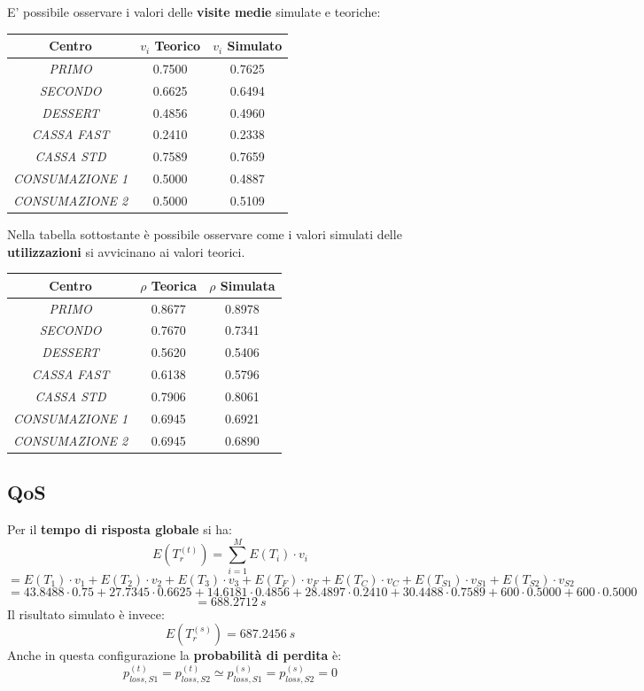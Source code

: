 \documentclass{article}
\begin{document}
E' possibile osservare i valori delle \textbf{visite medie} simulate e teoriche:
\begin{center}
\begin{tabular}{|c|c|c|}
 \hline
 \textbf{Centro} & $v_i$ \textbf{Teorico} & $v_i$ \textbf{Simulato}\\
 \hline
 \textit{PRIMO} & 0.7500 & 0.7625\\
 \hline
 \textit{SECONDO} & 0.6625 & 0.6494\\
 \hline
 \textit{DESSERT} & 0.4856 & 0.4960\\
 \hline
 \textit{CASSA FAST} & 0.2410 & 0.2338\\
 \hline
 \textit{CASSA STD} & 0.7589 & 0.7659\\
 \hline
 \textit{CONSUMAZIONE 1} & 0.5000 & 0.4887\\
 \hline
 \textit{CONSUMAZIONE 2} & 0.5000 & 0.5109\\
 \hline
\end{tabular}
\end{center}

Nella tabella sottostante è possibile osservare come i valori simulati delle \textbf{utilizzazioni} si avvicinano ai valori teorici.
\begin{center}
\begin{tabular}{|c|c|c|}
 \hline
 \textbf{Centro} & $\rho$ \textbf{Teorica} & $\rho$ \textbf{Simulata}\\
 \hline
 \textit{PRIMO} & 0.8677 & 0.8978\\
 \hline
 \textit{SECONDO} & 0.7670 & 0.7341\\
 \hline
 \textit{DESSERT} & 0.5620 & 0.5406\\
 \hline
 \textit{CASSA FAST} & 0.6138 & 0.5796\\
 \hline
 \textit{CASSA STD} & 0.7906 & 0.8061\\
 \hline
 \textit{CONSUMAZIONE 1} & 0.6945 & 0.6921\\
 \hline
 \textit{CONSUMAZIONE 2} & 0.6945 & 0.6890\\
 \hline
\end{tabular}
\end{center}
\subsection{QoS}
Per il \textbf{tempo di risposta globale} si ha: 
\[E(T_{r}^{(t)}) = \sum_{i=1}^{M} E(T_{i}) \cdot v_{i} \]
\[= E(T_1) \cdot v_1+ E(T_2) \cdot v_{2} + E(T_{3}) \cdot v_{3} + E(T_{F}) \cdot v_{F} + E(T_{C}) \cdot v_{C} + E(T_{S1}) \cdot v_{S1} + E(T_{S2}) \cdot v_{S2}\]
\[=  43.8488 \cdot 0.75 + 27.7345 \cdot 0.6625 + 14.6181 \cdot 0.4856 + 28.4897 \cdot 0.2410 + 30.4488 \cdot 0.7589 + 600 \cdot 0.5000 + 600 \cdot 0.5000\]
\[ = 688.2712\ s\]
Il risultato simulato è invece: 
\[E(T_{r}^{(s)}) = 687.2456\ s\]
Anche in questa configurazione la \textbf{probabilità di perdita} è:
\[p_{loss, S1}^{(t)} = p_{loss, S2}^{(t)} \simeq p_{loss, S1}^{(s)} = p_{loss, S2}^{(s)} = 0 \]
\end{document}
